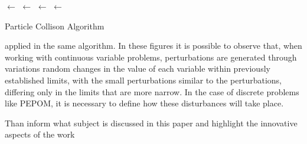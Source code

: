 \begin{algorithm}


\Input{\initialSolution, \evalFitness{}}
\Output{\betterSolution, \fitnessBetter}
\BlankLine
\betterSolution $\leftarrow$ \currentSolution $\leftarrow$ \initialSolution\;
\fitnessBetter $\leftarrow$ \fitnessCurrent $\leftarrow$ \evalFitness{\currentSolution}\;

\caption{Particle Collison Algorithm}\label{alg:PCA}
\end{algorithm}\DecMargin{1em} 




applied in the same algorithm. In these figures it is possible to observe that, when working with continuous variable problems, perturbations are generated through variations random changes in the value of each variable within previously established limits, with the small perturbations similar to the perturbations, differing only in the limits that are more narrow. In the case of discrete problems like PEPOM, it is necessary to define how these disturbances will take place. 

Than inform what subject is discussed in this paper and highlight the innovative aspects of the work

